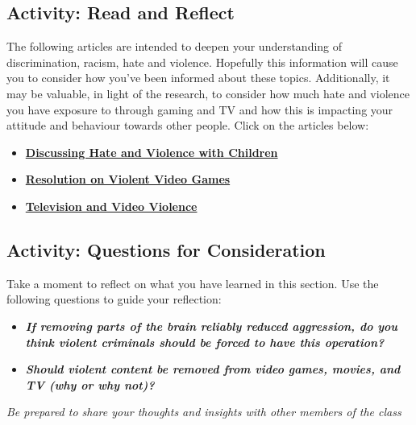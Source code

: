 \documentclass[
]{book}
\providecommand{\tightlist}{%
  \setlength{\itemsep}{0pt}\setlength{\parskip}{0pt}}
\begin{document}
\hypertarget{activity-read-and-reflect-10}{%
\subsection*{Activity: Read and Reflect}\label{activity-read-and-reflect-10}}

\begin{reflect}
The following articles are intended to deepen your understanding of discrimination, racism, hate and violence. Hopefully this information will cause you to consider how you've been informed about these topics. Additionally, it may be valuable, in light of the research, to consider how much hate and violence you have exposure to through gaming and TV and how this is impacting your attitude and behaviour towards other people. Click on the articles below:

\begin{itemize}
\tightlist
\item
  \href{https://www.adl.org/education/resources/tools-and-strategies/discussing-hate-and-violence-with-children}{\textbf{Discussing Hate and Violence with Children}}\\
\item
  \href{https://www.apa.org/about/policy/violent-video-games}{\textbf{Resolution on Violent Video Games}}\\
\item
  \href{https://www.apa.org/action/resources/research-in-action/protect}{\textbf{Television and Video Violence}}
\end{itemize}
\end{reflect}

\hypertarget{activity-questions-for-consideration-12}{%
\subsection*{Activity: Questions for Consideration}\label{activity-questions-for-consideration-12}}

\begin{reflect}
Take a moment to reflect on what you have learned in this section. Use the following questions to guide your reflection:

\begin{itemize}
\tightlist
\item
  \textbf{\emph{If removing parts of the brain reliably reduced aggression, do you think violent criminals should be forced to have this operation?}}
\item
  \textbf{\emph{Should violent content be removed from video games, movies, and TV (why or why not)?}}
\end{itemize}

\emph{Be prepared to share your thoughts and insights with other members of the class}
\end{reflect}
\end{document}
